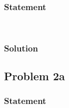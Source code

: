 \documentclass[conf]{new-aiaa}
\begin{document}
\subsubsection*{Statement} 
\begin{center}
	 \\
\end{center}


\subsubsection*{Solution} 





\subsection*{Problem 2a} 

\subsubsection*{Statement} 
\begin{center}
	 \\
\end{center}
\end{document}
